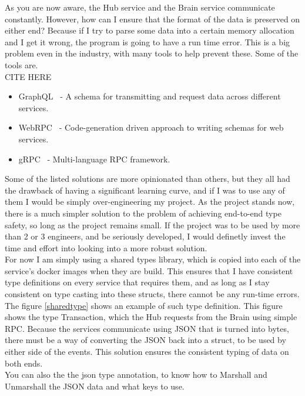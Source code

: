 \documentclass[titlepage]{article}
\begin{document}
As you are now aware, the Hub service and the Brain service communicate constantly. However, how can I ensure that the format of the data is preserved on either end? Because if I try to parse some data into a certain memory allocation and I get it wrong, the program is going to have a run time error. This is a big problem even in the industry, with many tools to help prevent these. Some of the tools are. \\

CITE HERE
\begin{itemize}
  \item GraphQL~\cite{graphql} - A schema for transmitting and request data across different services.
  \item WebRPC~\cite{webrpc} - Code-generation driven approach to writing schemas for web services.
  \item gRPC~\cite{grpc} - Multi-language RPC framework.
\end{itemize}

Some of the listed solutions are more opinionated than others, but they all had the drawback of having a significant learning curve, and if I was to use any of them I would be simply over-engineering my project. As the project stands now, there is a much simpler solution to the problem of achieving end-to-end type safety, so long as the project remains small. If the project was to be used by more than 2 or 3 engineers, and be seriously developed, I would definetly invest the time and effort into looking into a more robust solution. \\

For now I am simply using a shared types library, which is copied into each of the service's docker images when they are build. This ensures that I have consistent type definitions on every service that requires them, and as long as I stay consistent on type casting into these structs, there cannot be any run-time errors. The figure \ref{sharedtype} shows an example of such type definition. This figure shows the type Transaction, which the Hub requests from the Brain using simple RPC. Because the services communicate using JSON that is turned into bytes, there must be a way of converting the JSON back into a struct, to be used by either side of the events. This solution ensures the consistent typing of data on both ends. \\

You can also the the json type annotation, to know how to Marshall and Unmarshall the JSON data and what keys to use.
\end{document}
